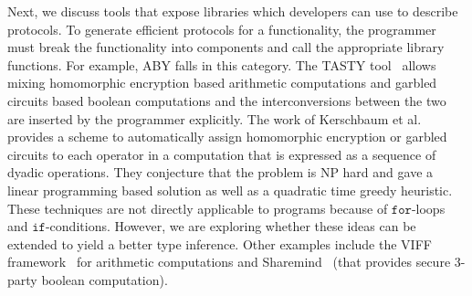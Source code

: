 Next, we discuss tools that expose libraries which  developers can use to describe \mpc protocols. 
To generate efficient protocols for a functionality, the programmer must break the functionality into components and call the appropriate library functions. For example,  ABY \cite{aby} falls in this category. The TASTY tool~\cite{tasty} allows mixing homomorphic encryption based arithmetic computations 
and garbled circuits based boolean computations and the interconversions between the two are inserted by the programmer explicitly.
The work of Kerschbaum et al.~\cite{autoS} provides a scheme to automatically assign homomorphic encryption or garbled circuits to each operator in a computation that is expressed as a sequence of dyadic operations. They conjecture that the problem is NP hard and gave a linear programming based solution as well as a quadratic time greedy heuristic. 
These techniques are not directly applicable to \tool programs because of $\mathtt{for}$-loops and $\mathtt{if}$-conditions.
However, we are exploring whether these ideas can be extended to yield a better type inference.
Other examples include the VIFF framework~\cite{viff} for arithmetic computations and Sharemind~\cite{sharemind} (that provides secure 3-party boolean computation). 


